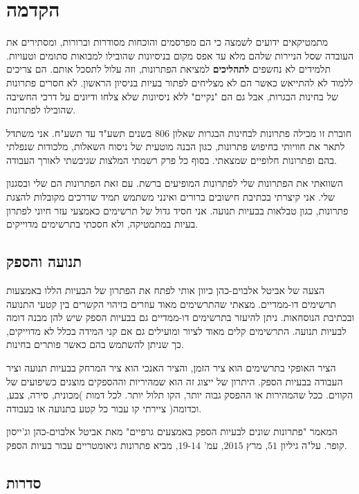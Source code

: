 \cleardoublepage
{}

\section*{הקדמה}

מתמטיקאים ידועים לשמצה כי הם מפרסמים והוכחות מסודרות וברורות, ומסתירים את העובדה שסל הניירות שלהם מלא עד אפס מקום בניסיונות שהובילו למבואות סתומים וטעויות. תלמידים לא נחשפים
\textbf{לתהליכים}
למציאת הפתרונות, וזה עלול לתסכל אותם. הם צריכים ללמוד לא להתייאש כאשר הם לא מצליחים לפתור בעיות בניסיון הראשון. לא חסרים פתרונות של בחינות הבגרות, אבל גם הם "נקיים" ללא ניסיונות שלא צלחו ודיונים על דרכי החשיבה שהובילו לפתרונות.

חוברת זו מכילה פתרונות לבחינות הבגרות שאלון
$806$
בשנים תשע"ד עד תשע"ח. אני משתדל לתאר את חוויותי בחיפוש פתרונות, כגון הבנה מוטעית של ניסוח השאלות, מלכודות שנפלתי בהם ופתרונות חלופיים שמצאתי. בסוף כל פרק רשמתי המלצות שגיבשתי לאורך העבודה.

השוואתי את הפתרונות שלי לפתרונות המופיעים ברשת. עם זאת הפתרונות הם שלי ובסגנון שלי. אני קיצרתי בכתיבת חישובים ברורים ואינני משתמש תמיד שדרכים מקובלות להצגת פתרונות, כגון טבלאות בבעיות תנועה. אני חסיד גדול של תרשימים כאמצעי עזר חיוני לפתרון בעיות במתמטיקה, ולא חסכתי בתרשימים מדוייקים.

\subsection*{תנועה והספק}

הצעה של אביטל אלבוים-כהן כיוון אותי לפתח את הפתרון של הבעיות הללו באמצעות תרשימים דו-ממדיים. מצאתי שהתרשימים מאוד עוזרים בזיהוי הקשרים בין קטעי התנועה ובכתיבת הנוסחאות. ניתן להיעזר בתרשימים דו-ממדיים גם בבעיות הספק שיש להן מבנה דומה לבעיות תנועה. התרשימים קלים מאוד לציור ומועילים גם אם קני המידה בכלל לא מדוייקים, כך שניתן להשתמש בהם כאשר פותרים בחינות.


הציר האופקי בתרשימים הוא ציר הזמן, והציר האנכי הוא ציר המרחק בבעיות תנועה וציר העבודה בבעיות הספק. היתרון של ייצוג זה הוא שמהיריות וההספקים מוצגים כשיפועים של הקווים. ככל שהמהירות או ההפסק גבוה יותר, הקו תלול יותר. לכל דמות )מכונית, סירה, צבע, וכדומה( ציירתי קו עבור כל קטע בתנועה או בעבודה.

המאמר "פתרונות שונים לבעיות הספק באמצעים גרפיים" מאת אביטל אלבוים-כהן וג'ייסון קופר. על"ה גיליון
$51$,
מרץ
$2015$,
עמ'
$14$-$19$,
מביא פתרונות גיאומטריים עבור בעיות הספק.

\subsection*{סדרות}

